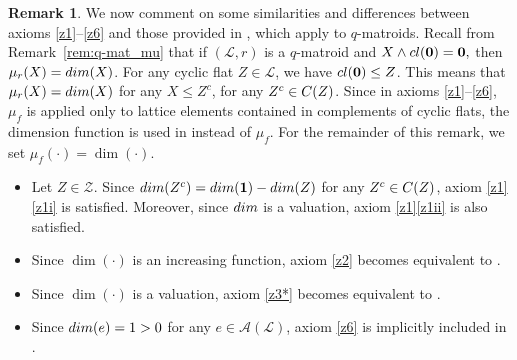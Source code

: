 \documentclass[a4paper,11pt,reqno]{article}
\theoremstyle{definition}
\newtheorem{remark}[theorem]{{{Remark}}}
\newcommand{\mA}{\mathcal{A}}
\newcommand{\one}{{\mathbf{1}}}
\newcommand{\zero}{{\mathbf{0}}}
\begin{document}
\begin{remark}
    We now comment on some similarities and differences between axioms \ref{z1}--\ref{z6} and those provided in \cite[Definition 3.1]{AlfByr22}, which apply to $q$-matroids. Recall from Remark~\ref{rem:q-mat_mu} that if $(\mathcal{L},r)$ is a $q$-matroid and $X\wedge\textup{cl}(\zero)=\zero,$
    then $\mu_r(X)=\textup{dim}(X)$. For any cyclic flat $Z\in\mathcal{L}$, we have $\textup{cl}(\zero)\leq Z$. This means that $\mu_r(X)=\textup{dim}(X)$ for any $X\leq Z^c$, for any $Z^c\in\textup{\textbf{C}}(Z)$. Since in axioms \ref{z1}--\ref{z6}, $\mu_f$ is applied only to lattice elements contained in complements of cyclic flats, the dimension function is used in \cite{AlfByr22} instead of $\mu_f$. For the remainder of this remark, we set $\mu_f(\cdot)=\dim(\cdot).$
    \begin{itemize}
        \item Let $Z\in\mathcal{Z}$. Since $\textup{dim}(Z^c)=\textup{dim}(\one)-\textup{dim}(Z)$
        for any $Z^c\in\textup{\textbf{C}}(Z)$, axiom \ref{z1}\ref{z1i} is satisfied. Moreover, since $\textup{dim}$ is a valuation, axiom \ref{z1}\ref{z1ii} is also satisfied.
        \item Since $\dim(\cdot)$ is an increasing function, axiom \ref{z2} becomes equivalent to \cite[(Z3)]{AlfByr22}.
        \item Since $\dim(\cdot)$ is a valuation, axiom \ref{z3*} becomes equivalent to \cite[(Z2)]{AlfByr22}.
        \item Since $\textup{dim}(e)=1>0$ for any $e\in\mA(\mathcal{L})$, axiom \ref{z6} is implicitly included in \cite{AlfByr22}.
    \end{itemize}
\end{remark}
\end{document}
